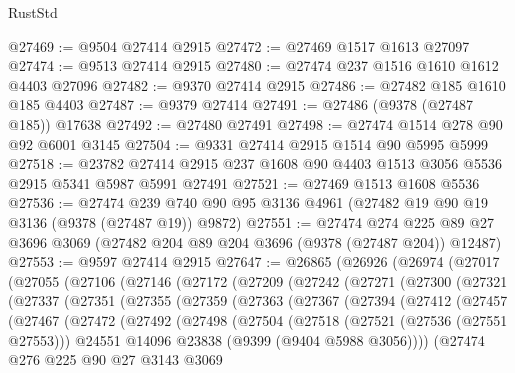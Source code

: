 \begin{lexlean}{RustStd}
\begin{coremodule}
@27469 := @9504 @27414 @2915
@27472 := @27469 @1517 @1613 @27097
@27474 := @9513 @27414 @2915
@27480 := @27474 @237 @1516 @1610 @1612 @4403 @27096
@27482 := @9370 @27414 @2915
@27486 := @27482 @185 @1610 @185 @4403
@27487 := @9379 @27414
@27491 := @27486 (@9378 (@27487 @185)) @17638
@27492 := @27480 @27491
@27498 := @27474 @1514 @278 @90 @92 @6001 @3145
@27504 := @9331 @27414 @2915 @1514 @90 @5995 @5999
@27518 := @23782 @27414 @2915 @237 @1608 @90 @4403 @1513 @3056 @5536 @2915 @5341 @5987 @5991 @27491
@27521 := @27469 @1513 @1608 @5536
@27536 := @27474 @239 @740 @90 @95 @3136 @4961 (@27482 @19 @90 @19 @3136 (@9378 (@27487 @19)) @9872)
@27551 := @27474
    @274
    @225
    @89
    @27
    @3696
    @3069
    (@27482 @204 @89 @204 @3696 (@9378 (@27487 @204)) @12487)
@27553 := @9597 @27414 @2915
@27647 := @26865
    (@26926
      (@26974
        (@27017
          (@27055
            (@27106
              (@27146
                (@27172
                  (@27209
                    (@27242
                      (@27271
                        (@27300
                          (@27321
                            (@27337
                              (@27351
                                (@27355
                                  (@27359
                                    (@27363
                                      (@27367
                                        (@27394
                                          (@27412
                                            (@27457
                                              (@27467
                                                (@27472
                                                  (@27492
                                                    (@27498
                                                      (@27504
                                                        (@27518
                                                          (@27521 (@27536 (@27551 @27553)))
                                                          @24551
                                                          @14096
                                                          @23838
                                                          (@9399 (@9404 @5988 @3056))))
                                                      (@27474
                                                        @276
                                                        @225
                                                        @90
                                                        @27
                                                        @3143
                                                        @3069

\end{coremodule}
\end{lexlean}
